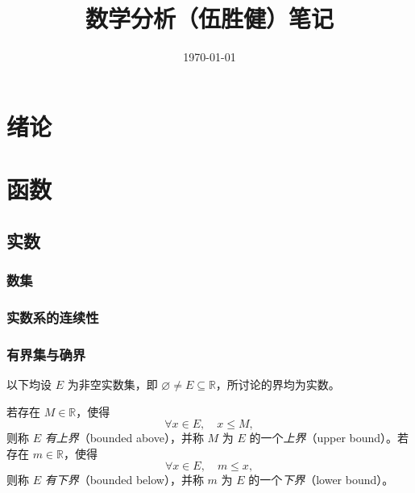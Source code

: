 \documentclass[UTF8,12pt,a4paper,fontset=fandol]{ctexbook}
\title{数学分析（伍胜健）笔记}
\author{}
\date{\today}
\begin{document}
\maketitle

\frontmatter
\tableofcontents

\chapter{绪论}

\mainmatter


\chapter{函数}
\label{chap:functions}

\section{实数}
\label{sec:real-numbers}

\subsection{数集}
\label{subsec:number-sets}

\subsection{实数系的连续性}
\label{subsec:continuity-of-real-numbers}

\subsection{有界集与确界}
\label{subsec:bounded-sets-and-bounds}

以下均设 $E$ 为非空实数集，即 $\varnothing\neq E\subseteq\mathbb{R}$，所讨论的界均为实数。

\begin{definition}
\label{def:upper-and-lower-bounds}
若存在 $M\in\mathbb{R}$，使得
\[
    \forall x\in E,\quad x\leq M,
\]
则称 $E$ \emph{有上界}（bounded above），并称 $M$ 为 $E$ 的一个\emph{上界}（upper bound）。若存在 $m\in\mathbb{R}$，使得
\[
    \forall x\in E,\quad m\leq x,
\]
则称 $E$ \emph{有下界}（bounded below），并称 $m$ 为 $E$ 的一个\emph{下界}（lower bound）。
\end{definition}
\end{document}
